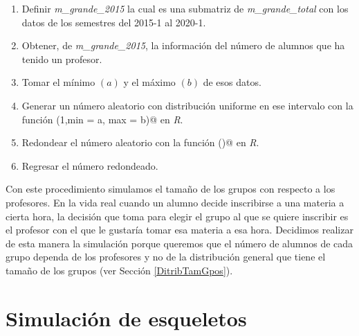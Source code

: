   \begin{enumerate}
\item Definir \textit{m\_grande\_2015} la cual es una submatriz de \textit{m\_grande\_total} con los datos de los semestres del 2015-1 al 2020-1.

\item Obtener, de \textit{m\_grande\_2015}, la información del número de alumnos que ha tenido un profesor.

\item Tomar el mínimo $(a)$ y el máximo $(b)$ de esos datos.

\item Generar un número aleatorio con distribución uniforme en ese intervalo con la función \verb@runif(1,min = a, max = b)@ en \textit{R}.

\item Redondear el número aleatorio con la función \verb@ceiling()@ en \textit{R}.

\item Regresar el número redondeado.
\end{enumerate}

Con este procedimiento simulamos el tamaño de los grupos con respecto a los profesores. En la vida real cuando un alumno decide inscribirse a una materia a cierta hora, la decisión que toma para elegir el grupo al que se quiere inscribir es el profesor con el que le gustaría tomar esa materia a esa hora. Decidimos realizar de esta manera la simulación porque queremos que el número de alumnos de cada grupo dependa de los profesores y no de la distribución general que tiene el tamaño de los grupos (ver Sección \ref{DitribTamGpos}).




\section{Simulación de esqueletos}


